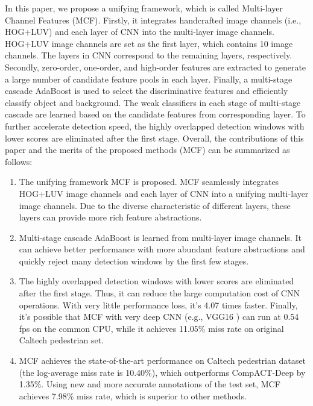 \documentclass[journal]{IEEEtran}
\begin{document}
In this paper, we propose a unifying framework, which is called Multi-layer Channel Features (MCF). Firstly, it integrates handcrafted image channels (i.e., HOG+LUV) and each layer of CNN into the multi-layer image channels. HOG+LUV image channels are set as the first layer, which contains 10 image channels. The layers in CNN correspond to the remaining layers, respectively. Secondly, zero-order, one-order, and high-order features are extracted to generate a large number of candidate feature pools in each layer. Finally, a multi-stage cascade AdaBoost is used to select the discriminative features and efficiently classify object and background. The weak classifiers in each stage of multi-stage cascade are learned based on the candidate features from corresponding layer. To further accelerate detection speed, the highly overlapped detection windows with lower scores are eliminated after the first stage. Overall, the contributions of this paper and the merits of the proposed methods (MCF) can be summarized as follows:


\begin{enumerate}
\item The unifying framework MCF is proposed. MCF seamlessly integrates HOG+LUV image channels and each layer of CNN into a unifying multi-layer image channels. Due to the diverse characteristic of different layers, these layers can provide more rich feature abstractions.

\item  Multi-stage cascade AdaBoost is learned from multi-layer image channels. It can achieve better performance with more abundant feature abstractions and quickly reject many detection windows by the first few stages.

\item  The highly overlapped detection windows with lower scores are eliminated after the first stage. Thus, it can reduce the large computation cost of CNN operations. With very little performance loss, it's 4.07 times faster. Finally, it's possible that MCF with very deep CNN (e.g., VGG16 \cite{Simonyan_VGG_arXiv_2015}) can run at 0.54 fps on the common CPU, while it achieves 11.05\% miss rate on original Caltech pedestrian set.

\item  MCF achieves the state-of-the-art performance on Caltech pedestrian dataset (the log-average miss rate is 10.40\%), which outperforms CompACT-Deep \cite{Cai_CompACT_ICCV_2015} by 1.35\%. Using new and more accurate annotations \cite{Zhang_RotatedFilters_arXiv_2016} of the test set, MCF achieves 7.98\% miss rate, which is superior to other methods.


\end{enumerate}
\end{document}
